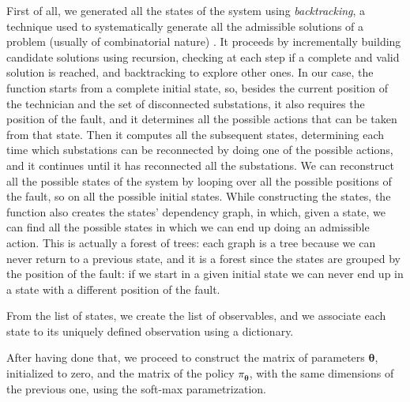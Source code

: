 First of all, we generated all the states of the system using \emph{backtracking}, a technique used to systematically generate all the admissible solutions of a problem (usually of combinatorial nature) \cite{Montresor2014}. It proceeds by incrementally building candidate solutions using recursion, checking at each step if a complete and valid solution is reached, and backtracking to explore other ones. In our case, the function starts from a complete initial state, so, besides the current position of the technician and the set of disconnected substations, it also requires the position of the fault, and it determines all the possible actions that can be taken from that state. Then it computes all the subsequent states, determining each time which substations can be reconnected by doing one of the possible actions, and it continues until it has reconnected all the substations. We can reconstruct all the possible states of the system by looping over all the possible positions of the fault, so on all the possible initial states. While constructing the states, the function also creates the states' dependency graph, in which, given a state, we can find all the possible states in which we can end up doing an admissible action. This is actually a forest of trees: each graph is a tree because we can never return to a previous state, and it is a forest since the states are grouped by the position of the fault: if we start in a given initial state we can never end up in a state with a different position of the fault.

From the list of states, we create the list of observables, and we associate each state to its uniquely defined observation using a dictionary.

After having done that, we proceed to construct the matrix of parameters $\boldsymbol \theta$, initialized to zero, and the matrix of the policy $\pi_{\boldsymbol \theta}$, with the same dimensions of the previous one, using the soft-max parametrization.

